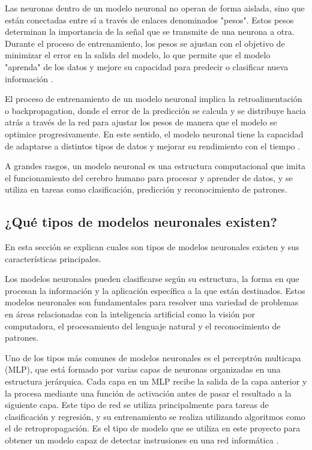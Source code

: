 Las neuronas dentro de un modelo neuronal no operan de forma aislada, sino que están conectadas entre sí a través de enlaces denominados "pesos". Estos pesos determinan la importancia de la señal que se transmite de una neurona a otra. Durante el proceso de entrenamiento, los pesos se ajustan con el objetivo de minimizar el error en la salida del modelo, lo que permite que el modelo "aprenda" de los datos y mejore su capacidad para predecir o clasificar nueva información \cite{haykin2009neural}.

El proceso de entrenamiento de un modelo neuronal implica la retroalimentación o backpropagation, donde el error de la predicción se calcula y se distribuye hacia atrás a través de la red para ajustar los pesos de manera que el modelo se optimice progresivamente. En este sentido, el modelo neuronal tiene la capacidad de adaptarse a distintos tipos de datos y mejorar su rendimiento con el tiempo \cite{nielsen2015neural}.

A grandes rasgos, un modelo neuronal es una estructura computacional que imita el funcionamiento del cerebro humano para procesar y aprender de datos, y se utiliza en tareas como clasificación, predicción y reconocimiento de patrones.


\subsection{¿Qué tipos de modelos neuronales existen?}

En esta sección se explican cuales son tipos de modelos neuronales existen y sus características principales. 

Los modelos neuronales pueden clasificarse según su estructura, la forma en que procesan la información y la aplicación específica a la que están destinados. Estos modelos neuronales son fundamentales para resolver una variedad de problemas en áreas relacionadas con la inteligencia artificial como la visión por computadora, el procesamiento del lenguaje natural y el reconocimiento de patrones.

Uno de los tipos más comunes de modelos neuronales es el perceptrón multicapa (MLP), que está formado por varias capas de neuronas organizadas en una estructura jerárquica. Cada capa en un MLP recibe la salida de la capa anterior y la procesa mediante una función de activación antes de pasar el resultado a la siguiente capa. Este tipo de red se utiliza principalmente para tareas de clasificación y regresión, y su entrenamiento se realiza utilizando algoritmos como el de retropropagación. Es el tipo de modelo que se utiliza en este proyecto para obtener un modelo capaz de detectar instrusiones en una red informática \cite{goodfellow2016deep}.

